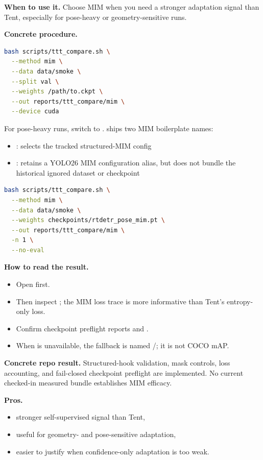 \textbf{When to use it.}
Choose MIM when you need a stronger adaptation signal than Tent, especially for pose-heavy or geometry-sensitive runs.

\textbf{Concrete procedure.}
\begin{lstlisting}[language=bash]
bash scripts/ttt_compare.sh \
  --method mim \
  --data data/smoke \
  --split val \
  --weights /path/to.ckpt \
  --out reports/ttt_compare/mim \
  --device cuda
\end{lstlisting}

For pose-heavy runs, switch to . \yolozu{} ships
two MIM boilerplate names:
\begin{itemize}
  \item {}: selects the tracked structured-MIM config
  \item {}: retains a YOLO26 MIM configuration alias, but does not bundle the historical ignored dataset or checkpoint
\end{itemize}

\begin{lstlisting}[language=bash]
bash scripts/ttt_compare.sh \
  --method mim \
  --data data/smoke \
  --weights checkpoints/rtdetr_pose_mim.pt \
  --out reports/ttt_compare/mim \
  -n 1 \
  --no-eval
\end{lstlisting}

\textbf{How to read the result.}
\begin{itemize}
  \item Open  first.
  \item Then inspect ; the MIM loss trace is more informative than Tent's entropy-only loss.
  \item Confirm checkpoint preflight reports  and .
  \item When  is unavailable, the fallback is named
  \cmd{proxy_ap50}/\cmd{proxy_ap50_95}; it is not COCO mAP.
\end{itemize}

\textbf{Concrete repo result.}
Structured-hook validation, mask controls, loss accounting, and fail-closed
checkpoint preflight are implemented. No current checked-in measured bundle
establishes MIM efficacy.

\textbf{Pros.}
\begin{itemize}
  \item stronger self-supervised signal than Tent,
  \item useful for geometry- and pose-sensitive adaptation,
  \item easier to justify when confidence-only adaptation is too weak.
\end{itemize}

